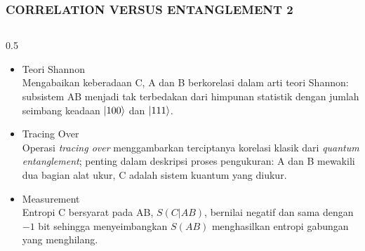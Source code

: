 \begin{frame}
    \frametitle{CORRELATION VERSUS ENTANGLEMENT 2}
    \vspace*{-0.5cm}
    \begin{columns}[T]
        \begin{column}{0.5\textwidth}
            \begin{itemize}\tiny\justifying
                \item[$\Rightarrow$] Teori Shannon \\
                    Mengabaikan keberadaan C, A dan B berkorelasi dalam arti
                    teori Shannon: subsistem AB menjadi tak terbedakan dari
                    himpunan statistik dengan jumlah seimbang keadaan
                    $\ket{100}$ dan $\ket{111}$.
                \item[$\Rightarrow$] Tracing Over \\
                    Operasi \textit{tracing over} menggambarkan terciptanya
                    korelasi klasik dari \textit{quantum entanglement}; penting
                    dalam deskripsi proses pengukuran: A dan B mewakili dua
                    bagian alat ukur, C adalah sistem kuantum yang diukur.
                \item[$\Rightarrow$] Measurement \\
                    Entropi C bersyarat pada AB, $S(C|AB)$, bernilai negatif
                    dan sama dengan $-1$ bit sehingga menyeimbangkan $S(AB)$
                    menghasilkan entropi gabungan yang menghilang.
            \end{itemize}
        \end{column}


\end{columns}
\end{frame}
